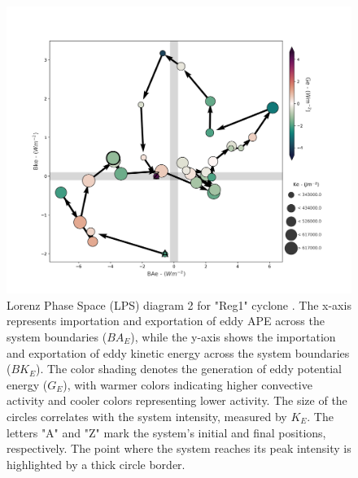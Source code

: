 \begin{figure}[!htbp]
\centering
\includegraphics[width=\textwidth]{figs_6/lps-import_Reg1-Representative_NCEP-R2_fixed.png}
\caption[LPS 2 - "Reg1" Cyclone]{Lorenz Phase Space (LPS) diagram 2 for "Reg1" cyclone \citep{dias2011energy}. The x-axis represents importation and exportation of eddy APE across the system boundaries ($BA_E$), while the y-axis shows the importation and exportation of eddy kinetic energy across the system boundaries ($BK_E$). The color shading denotes the generation of eddy potential energy ($G_E$), with warmer colors indicating higher convective activity and cooler colors representing lower activity. The size of the circles correlates with the system intensity, measured by $K_E$. The letters "A" and "Z" mark the system's initial and final positions, respectively. The point where the system reaches its peak intensity is highlighted by a thick circle border.}
\label{fig:lps_2_reg1}
\end{figure}



